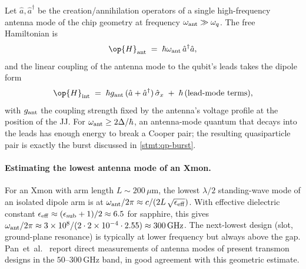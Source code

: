 \begin{statement}
\label{stmt:qubit-antenna}
Let $\hat a, \hat a^\dagger$ be the creation/annihilation
operators of a single high-frequency antenna mode of the chip
geometry at frequency $\omega_{\rm ant}\gg\omega_q$. The free
Hamiltonian is
\begin{equation}
\label{eq:antenna-mode}
\op{H}_{\rm ant} \;=\; \hbar\omega_{\rm ant}\,\hat a^\dagger\hat a,
\end{equation}
and the linear coupling of the antenna mode to the qubit's leads
takes the dipole form
\begin{equation}
\label{eq:antenna-qubit-coupling}
\op{H}_{\rm int} \;=\; \hbar g_{\rm ant}\,(\hat a + \hat a^\dagger)\,\hat\sigma_x
\;+\; \hbar\,(\text{lead-mode terms}),
\end{equation}
with $g_{\rm ant}$ the coupling strength fixed by the antenna's
voltage profile at the position of the JJ. For
$\omega_{\rm ant}\geq 2\Delta/\hbar$, an antenna-mode quantum
that decays into the leads has enough energy to break a Cooper
pair; the resulting quasiparticle pair is exactly the burst
discussed in \cref{stmt:qp-burst}.
\end{statement}

\paragraph{Estimating the lowest antenna mode of an Xmon.}
For an Xmon with arm length $L\sim 200\,\mu\text{m}$, the lowest
$\lambda/2$ standing-wave mode of an isolated dipole arm is at
$\omega_{\rm ant}/2\pi\approx c/(2L\,\sqrt{\epsilon_{\rm eff}})$.
With effective dielectric constant
$\epsilon_{\rm eff}\approx (\epsilon_{\rm sub}+1)/2\approx 6.5$
for sapphire, this gives
$\omega_{\rm ant}/2\pi\approx 3\times 10^8/(2\cdot 2\times 10^{-4}
\cdot 2.55)\approx 300\,\text{GHz}$.  The next-lowest design
(slot, ground-plane resonance) is typically at lower frequency
but always above the gap. Pan~et~al.~\cite{pan2022} report direct
measurements of antenna modes of present transmon designs in the
$50$--$300\,\text{GHz}$ band, in good agreement with this
geometric estimate.

